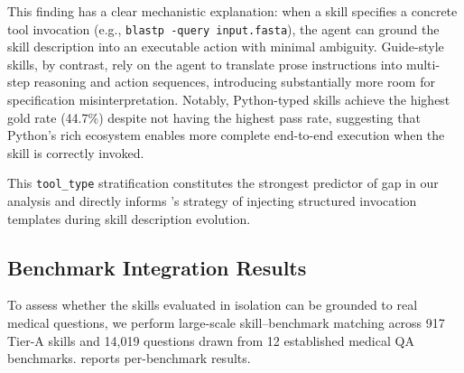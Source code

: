 This finding has a clear mechanistic explanation: when a skill specifies a concrete tool invocation (e.g., \texttt{blastp -query input.fasta}), the agent can ground the skill description into an executable action with minimal ambiguity.
Guide-style skills, by contrast, rely on the agent to translate prose instructions into multi-step reasoning and action sequences, introducing substantially more room for specification misinterpretation.
Notably, Python-typed skills achieve the highest gold rate (44.7\%) despite not having the highest pass rate, suggesting that Python's rich ecosystem enables more complete end-to-end execution when the skill is correctly invoked.

This \texttt{tool\_type} stratification constitutes the strongest predictor of \rbu gap in our analysis and directly informs \gepamed's strategy of injecting structured invocation templates during skill description evolution.

\subsection{Benchmark Integration Results}
\label{ssec:benchmark_integration}

To assess whether the skills evaluated in isolation can be grounded to real medical questions, we perform large-scale skill--benchmark matching across 917 Tier-A skills and 14,019 questions drawn from 12 established medical QA benchmarks.
 reports per-benchmark results.

